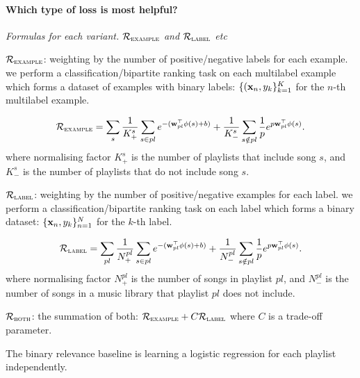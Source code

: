 \paragraph{Which type of loss is most helpful?}

\TODO
{\it Formulas for each variant. $\mathcal{R}_\textsc{example}$ and $\mathcal{R}_\textsc{label}$ etc}

$\mathcal{R}_\textsc{example}$: weighting by the number of positive/negative labels for each example.
\ie we perform a classification/bipartite ranking task on each multilabel example 
which forms a dataset of examples with binary labels: $\{(\mathbf{x}_n, y_k\}_{k=1}^K$ for the $n$-th multilabel example.

\begin{equation*}
\mathcal{R}_\textsc{example} 
= \displaystyle \sum_s 
  \frac{1}{K_+^s} \sum_{s \in pl} e^{-(\mathbf{w}_{pl}^\top \phi(s) + b)} +
  \frac{1}{K_-^s} \sum_{s \notin pl} \frac{1}{p} e^{p \mathbf{w}_{pl}^\top \phi(s)}.
\end{equation*}
where normalising factor $K_+^s$ is the number of playlists that include song $s$,
and $K_-^s$ is the number of playlists that do not include song $s$.


$\mathcal{R}_\textsc{label}$: weighting by the number of positive/negative examples for each label.
\ie we perform a classification/bipartite ranking task on each label which forms a binary dataset:
$\{\mathbf{x}_n, y_k\}_{n=1}^N$ for the $k$-th label.

\begin{equation*}
\mathcal{R}_\textsc{label} 
= \displaystyle \sum_{pl}
  \frac{1}{N_+^{pl}} \sum_{s \in pl} e^{-(\mathbf{w}_{pl}^\top \phi(s) + b)} +
  \frac{1}{N_-^{pl}} \sum_{s \notin pl} \frac{1}{p} e^{p \mathbf{w}_{pl}^\top \phi(s)}.
\end{equation*}
where normalising factor $N_+^{pl}$ is the number of songs in playlist $pl$,
and $N_-^{pl}$ is the number of songs in a music library that playlist $pl$ does not include.


$\mathcal{R}_\textsc{both}$: the summation of both: $\mathcal{R}_\textsc{example} + C \mathcal{R}_\textsc{label}$ 
where $C$ is a trade-off parameter.

The binary relevance baseline is learning a logistic regression for each playlist independently.


